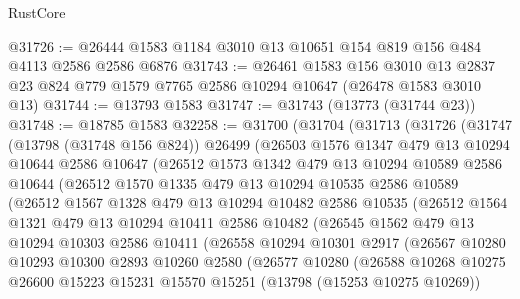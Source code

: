 \begin{lexlean}{RustCore}
\begin{coremodule}
@31726 := @26444 @1583 @1184 @3010 @13 @10651 @154 @819 @156 @484 @4113 @2586 @2586 @6876
@31743 := @26461
    @1583
    @156
    @3010
    @13
    @2837
    @23
    @824
    @779
    @1579
    @7765
    @2586
    @10294
    @10647
    (@26478 @1583 @3010 @13)
@31744 := @13793 @1583
@31747 := @31743 (@13773 (@31744 @23))
@31748 := @18785 @1583
@32258 := @31700
    (@31704
      (@31713
        (@31726
          (@31747
            (@13798 (@31748 @156 @824))
            @26499
            (@26503
              @1576
              @1347
              @479
              @13
              @10294
              @10644
              @2586
              @10647
              (@26512
                @1573
                @1342
                @479
                @13
                @10294
                @10589
                @2586
                @10644
                (@26512
                  @1570
                  @1335
                  @479
                  @13
                  @10294
                  @10535
                  @2586
                  @10589
                  (@26512
                    @1567
                    @1328
                    @479
                    @13
                    @10294
                    @10482
                    @2586
                    @10535
                    (@26512
                      @1564
                      @1321
                      @479
                      @13
                      @10294
                      @10411
                      @2586
                      @10482
                      (@26545
                        @1562
                        @479
                        @13
                        @10294
                        @10303
                        @2586
                        @10411
                        (@26558
                          @10294
                          @10301
                          @2917
                          (@26567
                            @10280
                            @10293
                            @10300
                            @2893
                            @10260
                            @2580
                            (@26577
                              @10280
                              (@26588
                                @10268
                                @10275
                                @26600
                                @15223
                                @15231
                                @15570
                                @15251
                                (@13798 (@15253 @10275 @10269))

\end{coremodule}
\end{lexlean}
